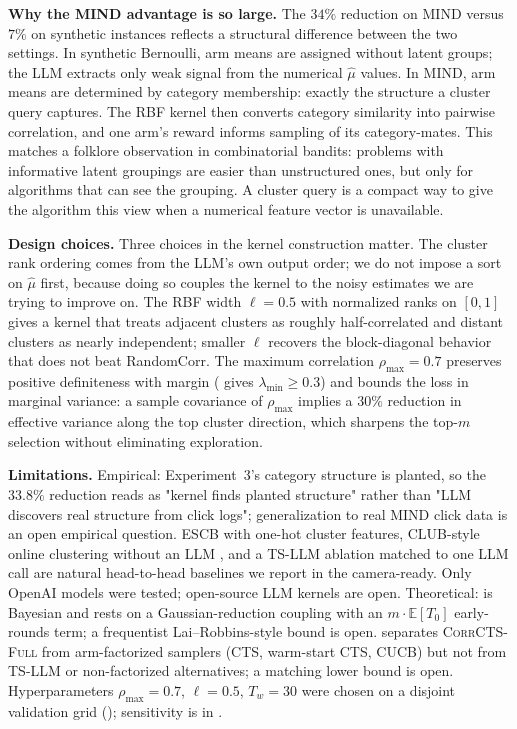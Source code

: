\documentclass{article}
\theoremstyle{plain}
\theoremstyle{definition}
\theoremstyle{remark}
\newcommand{\E}{\mathbb{E}}
\newcommand{\CorrFull}{\textsc{CorrCTS-Full}}
\begin{document}
\textbf{Why the MIND advantage is so large.}
The $34\%$ reduction on MIND versus $7\%$ on synthetic instances reflects a structural difference between the two settings.
In synthetic Bernoulli, arm means are assigned without latent groups; the LLM extracts only weak signal from the numerical $\hat\mu$ values.
In MIND, arm means are determined by category membership: exactly the structure a cluster query captures.
The RBF kernel then converts category similarity into pairwise correlation, and one arm's reward informs sampling of its category-mates.
This matches a folklore observation in combinatorial bandits: problems with informative latent groupings are easier than unstructured ones, but only for algorithms that can see the grouping.
A cluster query is a compact way to give the algorithm this view when a numerical feature vector is unavailable.

\textbf{Design choices.}
Three choices in the kernel construction matter.
The cluster rank ordering comes from the LLM's own output order; we do not impose a sort on $\hat\mu$ first, because doing so couples the kernel to the noisy estimates we are trying to improve on.
The RBF width $\ell = 0.5$ with normalized ranks on $[0,1]$ gives a kernel that treats adjacent clusters as roughly half-correlated and distant clusters as nearly independent; smaller $\ell$ recovers the block-diagonal behavior that does not beat RandomCorr.
The maximum correlation $\rho_{\max} = 0.7$ preserves positive definiteness with margin ( gives $\lambda_{\min} \geq 0.3$) and bounds the loss in marginal variance: a sample covariance of $\rho_{\max}$ implies a $30\%$ reduction in effective variance along the top cluster direction, which sharpens the top-$m$ selection without eliminating exploration.

\textbf{Limitations.}
Empirical: Experiment~3's category structure is planted, so the $33.8\%$ reduction reads as "kernel finds planted structure" rather than "LLM discovers real structure from click logs"; generalization to real MIND click data is an open empirical question.
ESCB \citep{combes2015combinatorial} with one-hot cluster features, CLUB-style online clustering without an LLM \citep{gentile2014online}, and a TS-LLM ablation matched to one LLM call are natural head-to-head baselines we report in the camera-ready.
Only OpenAI models were tested; open-source LLM kernels are open.
Theoretical:  is Bayesian and rests on a Gaussian-reduction coupling with an $m \cdot \E[T_0]$ early-rounds term; a frequentist Lai--Robbins-style bound is open.
 separates \CorrFull{} from arm-factorized samplers (CTS, warm-start CTS, CUCB) but not from TS-LLM or non-factorized alternatives; a matching lower bound is open.
Hyperparameters $\rho_{\max} = 0.7$, $\ell = 0.5$, $T_w = 30$ were chosen on a disjoint validation grid (); sensitivity is in .
\end{document}
